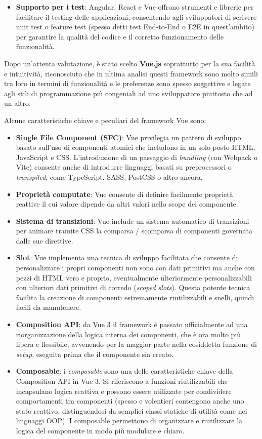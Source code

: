 \begin{itemize}
    \item \textbf{Supporto per i test}: Angular, React e Vue offrono strumenti e librerie per facilitare il testing delle applicazioni, consentendo agli sviluppatori di scrivere unit test o feature test (spesso detti test End-to-End o E2E in quest'ambito) per garantire la qualità del codice e il corretto funzionamento delle funzionalità.
\end{itemize}

Dopo un'attenta valutazione, è stato scelto \textbf{Vue.js} \cite{vue} soprattutto per la sua facilità e intuitività, riconosciuto che in ultima analisi questi framework sono molto simili tra loro in termini di funzionalità e le preferenze sono spesso soggettive e legate agli stili di programmazione più congeniali ad uno sviluppatore piuttosto che ad un altro.

Alcune caratteristiche chiave e peculiari del framework Vue sono:
\begin{itemize}
    \item \textbf{Single File Component (SFC)}: Vue privilegia un pattern di sviluppo basato sull'uso di componenti atomici che includono in un solo posto HTML, JavaScript e CSS. L'introduzione di un passaggio di \emph{bundling} (con Webpack o Vite) consente anche di introdurre linguaggi basati su preprocessori o \emph{transpiled}, come TypeScript, SASS, PostCSS o altro ancora.
    \item \textbf{Proprietà computate}: Vue consente di definire facilmente proprietà reattive il cui valore dipende da altri valori nello scope del componente.
    \item \textbf{Sistema di transizioni}: Vue include un sistema automatico di transizioni per animare tramite CSS la comparsa / scomparsa di componenti governata dalle sue direttive.
    \item \textbf{Slot}: Vue implementa una tecnica di sviluppo facilitata che consente di personalizzare i propri componenti non sono con dati primitivi ma anche con pezzi di HTML vero e proprio, eventualmente ulteriormente personalizzabili con ulteriori dati primitivi di corredo (\emph{scoped slots}). Questa potente tecnica facilita la creazione di componenti estremamente riutilizzabili e snelli, quindi facili da manutenere.
    \item \textbf{Composition API}: da Vue 3 il framework è passato ufficialmente ad una riorganizzazione della logica interna dei componenti, che è ora molto più libera e flessibile, avvenendo per la maggior parte nella cosiddetta funzione di \emph{setup}, eseguita prima che il componente sia creato.
    \item \textbf{Composable}: i \emph{composable} sono una delle caratteristiche chiave della Composition API in Vue 3. Si riferiscono a funzioni riutilizzabili che incapsulano logica reattiva e possono essere utilizzate per condividere comportamenti tra componenti (spesso e volentieri contengono anche uno stato reattivo, distinguendosi da semplici classi statiche di utilità come nei linguaggi OOP). I composable permettono di organizzare e riutilizzare la logica del componente in modo più modulare e chiaro.
\end{itemize}


